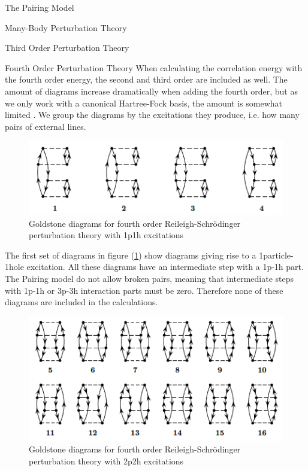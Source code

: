 \documentclass[twoside,english]{uiofysmaster}
\begin{document}
\begin{chapter}{The Pairing Model}
\begin{section}{Many-Body Perturbation Theory}
\begin{subsection}{Third Order Perturbation Theory}
		\end{subsection}

		\begin{subsection}{Fourth Order Perturbation Theory}
			When calculating the correlation energy with the fourth order energy, the second and third order are included as well. The amount of diagrams increase dramatically when adding the fourth order, but as we only work with a canonical Hartree-Fock basis, the amount is somewhat limited \cite{ShavittAndBartlett}. We group the diagrams by the excitations they produce, i.e. how many pairs of external lines. 
			\begin{figure}[H]
				\includegraphics[width=\textwidth]{Figures/fourthorder1p1h.png}
				\caption{Goldstone diagrams for fourth order Reileigh-Schr\"{o}dinger perturbation theory with 1p1h excitations}
				\label{figure:mbpt1p1h}
			\end{figure}
			The first set of diagrams in figure (\ref{figure:mbpt1p1h}) show diagrams giving rise to a 1particle-1hole excitation. All these diagrams have an intermediate step with a 1p-1h part. The Pairing model do not allow broken pairs, meaning that intermediate steps with 1p-1h or 3p-3h interaction parts must be zero. Therefore none of these diagrams are included in the calculations.
			\begin{figure}[H]
				\includegraphics[width=\textwidth]{Figures/fourthorder2p2h.png}
				\caption{Goldstone diagrams for fourth order Reileigh-Schr\"{o}dinger perturbation theory with 2p2h excitations}

\end{figure}
\end{subsection}
\end{section}
\end{chapter}
\end{document}
